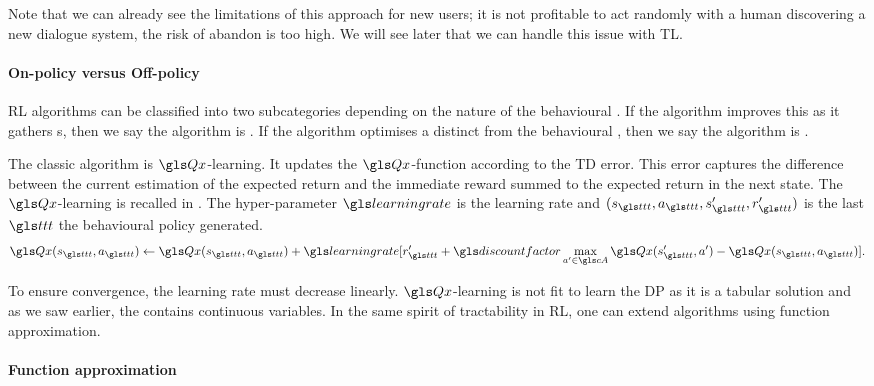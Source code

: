Note that we can already see the limitations of this approach for new users; it is not profitable to act randomly with a human discovering a new dialogue system, the risk of abandon is too high. We will see later that we can handle this issue with \gls{TL}.


\paragraph{On-policy versus Off-policy}

 \gls{RL} algorithms can be classified into two subcategories depending on the nature of the behavioural . If the algorithm improves this  as it gathers s, then we say the algorithm is . If the algorithm optimises a  distinct from the behavioural , then we say the algorithm is .

The classic  algorithm is $\Q$-learning. It updates the $\Q$-function according to the \gls{TD} error. This error captures the difference between the current estimation of the expected return and the immediate reward summed to the expected return in the next state. The $\Q$-learning is recalled in . The hyper-parameter ${\learningrate}$ is the learning rate and ${(s_{\indextransition},a_{\indextransition},s_{\indextransition}',r_{\indextransition}')}$ is the last  {${\indextransition}$} the behavioural policy generated.
\begin{equation}
    \Q({s_{{\indextransition}}}, {a_{{\indextransition}}}) \leftarrow \Q({s_{{\indextransition}}}, {a_{{\indextransition}}})+{\learningrate}[{r'_{{\indextransition}}}+\discountfactor \max _{a'\in\cA} \Q({s'_{{\indextransition}}}, a')-\Q({s_{{\indextransition}}}, {a_{{\indextransition}}})].
    \label{eq:q-learningg}
\end{equation}

To ensure convergence, the learning rate must decrease linearly. $\Q$-learning is not fit to learn the \gls{DP} as it is a tabular solution and as we saw earlier, the  contains continuous variables. In the same spirit of tractability in  \gls{RL}, one can extend  algorithms using function approximation.

\paragraph{Function approximation}

